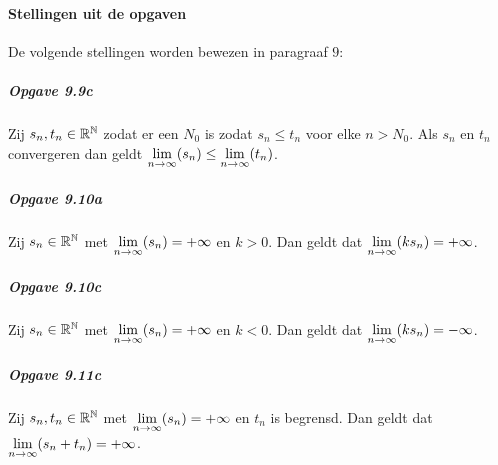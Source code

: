 \paragraph{Stellingen uit de opgaven} De volgende stellingen worden bewezen in paragraaf $9$:

\subparagraph{Opgave 9.9c} Zij $s_{n},t_{n}\in\mathbb{R}^{\mathbb{N}}$ zodat er een $N_{0}$ is zodat $s_{n} \leq t_{n}$ voor elke $n>N_{0}$. Als $s_{n}$ en $t_{n}$ convergeren dan geldt $\underset{n\to\infty}{\text{lim}}(s_{n})\leq\underset{n\to\infty}{\text{lim}}(t_{n})$.

\subparagraph{Opgave 9.10a} Zij $s_{n}\in\mathbb{R}^{\mathbb{N}}$ met $\underset{n\to\infty}{\text{lim}}(s_{n})=+\infty$ en $k>0$. Dan geldt dat $\underset{n\to\infty}{\text{lim}}(ks_{n})=+\infty$.

\subparagraph{Opgave 9.10c} Zij $s_{n}\in\mathbb{R}^{\mathbb{N}}$ met $\underset{n\to\infty}{\text{lim}}(s_{n})=+\infty$ en $k<0$. Dan geldt dat $\underset{n\to\infty}{\text{lim}}(ks_{n})=-\infty$.

\subparagraph{Opgave 9.11c} Zij $s_{n},t_{n}\in\mathbb{R}^{\mathbb{N}}$ met $\underset{n\to\infty}{\text{lim}}(s_{n})=+\infty$ en $t_{n}$ is begrensd. Dan geldt dat\\ $\underset{n\to\infty}{\text{lim}}(s_{n}+t_{n})=+\infty$.
